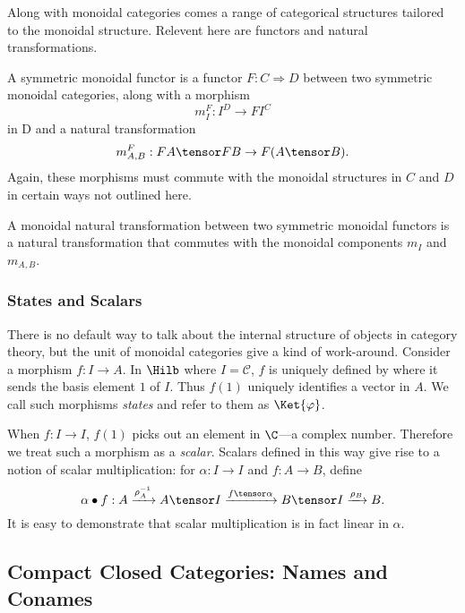 Along with monoidal categories comes a range of categorical structures tailored
to the monoidal structure. Relevent here are functors and natural transformations.

\begin{definition}
A symmetric monoidal functor is a functor $F : C \Rightarrow D$ between two symmetric
monoidal categories, along with a morphism
\[ m_I^F : I^D \rightarrow F I^C \]
in D and a natural transformation
\[ m_{A,B}^F : F A \tensor F B \rightarrow F(A \tensor B). \]
Again, these morphisms must commute with the monoidal structures in $C$ and $D$
in certain ways not outlined here. 

A monoidal natural transformation between two symmetric monoidal functors
is a natural transformation that commutes with the monoidal components $m_I$ and $m_{A,B}$.
\end{definition}

\subsubsection*{States and Scalars}
There is no default way to talk about the internal structure of objects in category theory,
but the unit of monoidal categories give a kind of work-around. Consider a morphism 
$f : I \rightarrow A$. In $\Hilb$ where $I=\mathcal{C}$, $f$ is uniquely defined by where it sends
the basis element $1$ of $I$. Thus $f(1)$ uniquely identifies a vector in $A$. We call such morphisms
\emph{states} and refer to them as $\Ket{\varphi}$.\footnotemark


When $f : I \rightarrow I$, $f(1)$ picks out an element in $\C$---a complex number.
Therefore we treat such a morphism as a \emph{scalar}.
Scalars defined in this way give rise to a notion of scalar multiplication: for 
$\alpha : I \rightarrow I$ and $f : A \rightarrow B$, define
\[ \alpha \bullet f : A \xrightarrow{\rho_A^{-1}} A \tensor I
    \xrightarrow{f \tensor \alpha} B \tensor I
    \xrightarrow{\rho_B} B.
\]
It is easy to demonstrate that scalar multiplication is in fact linear in $\alpha$.


\subsection{Compact Closed Categories: Names and Conames}

